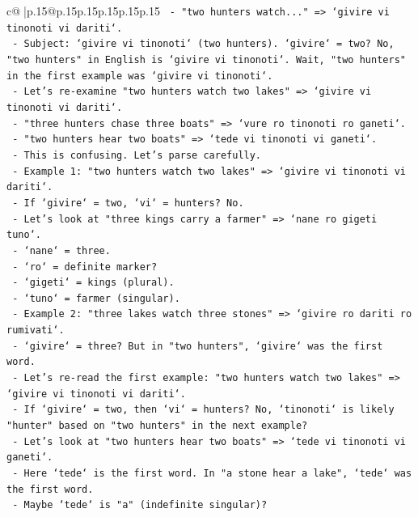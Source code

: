 \documentclass{article}
\begin{document}
{\begin{supertabular}{c@{$\;$}|p{.15\linewidth}@{}p{.15\linewidth}p{.15\linewidth}p{.15\linewidth}p{.15\linewidth}p{.15\linewidth}}
{{{\texttt{     {-} "two hunters watch..." => `givire vi tinonoti vi dariti`.} \\
\texttt{       {-} Subject: `givire vi tinonoti` (two hunters). `givire` = two? No, "two hunters" in English is `givire vi tinonoti`. Wait, "two hunters" in the first example was `givire vi tinonoti`.} \\
\texttt{       {-} Let's re{-}examine "two hunters watch two lakes" => `givire vi tinonoti vi dariti`.} \\
\texttt{       {-} "three hunters chase three boats" => `vure ro tinonoti ro ganeti`.} \\
\texttt{       {-} "two hunters hear two boats" => `tede vi tinonoti vi ganeti`.} \\
\texttt{       {-} This is confusing. Let's parse carefully.} \\
\texttt{       {-} Example 1: "two hunters watch two lakes" => `givire vi tinonoti vi dariti`.} \\
\texttt{         {-} If `givire` = two, `vi` = hunters? No.} \\
\texttt{         {-} Let's look at "three kings carry a farmer" => `nane ro gigeti tuno`.} \\
\texttt{           {-} `nane` = three.} \\
\texttt{           {-} `ro` = definite marker?} \\
\texttt{           {-} `gigeti` = kings (plural).} \\
\texttt{           {-} `tuno` = farmer (singular).} \\
\texttt{         {-} Example 2: "three lakes watch three stones" => `givire ro dariti ro rumivati`.} \\
\texttt{           {-} `givire` = three? But in "two hunters", `givire` was the first word.} \\
\texttt{           {-} Let's re{-}read the first example: "two hunters watch two lakes" => `givire vi tinonoti vi dariti`.} \\
\texttt{           {-} If `givire` = two, then `vi` = hunters? No, `tinonoti` is likely "hunter" based on "two hunters" in the next example?} \\
\texttt{           {-} Let's look at "two hunters hear two boats" => `tede vi tinonoti vi ganeti`.} \\
\texttt{             {-} Here `tede` is the first word. In "a stone hear a lake", `tede` was the first word.} \\
\texttt{             {-} Maybe `tede` is "a" (indefinite singular)?} \\
}}}
\end{supertabular}}
\end{document}
